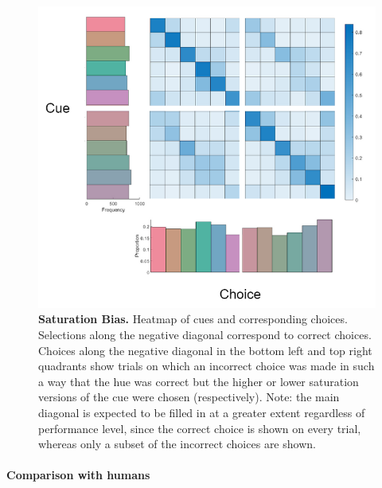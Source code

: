 \begin{figure}
\includegraphics[width=\textwidth]{../../Figures/saturationBias.png}
\caption{\textbf{Saturation Bias.}
Heatmap of cues and corresponding choices. Selections along the negative diagonal correspond to correct choices. Choices along the negative diagonal in the bottom left and top right quadrants show trials on which an incorrect choice was made in such a way that the hue was correct but the higher or lower saturation versions of the cue were chosen (respectively). Note: the main diagonal is expected to be filled in at a greater extent regardless of performance level, since the correct choice is shown on every trial, whereas only a subset of the incorrect choices are shown.}
\label{fig:saturationBias}
\end{figure}



\paragraph{Comparison with humans} %